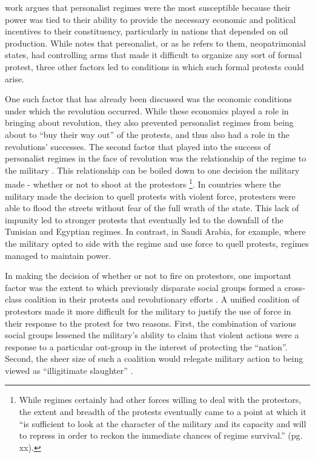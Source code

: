  work argues that personalist regimes were the most susceptible because their power was tied to their ability to provide the necessary economic and political incentives to their constituency, particularly in nations that depended on oil production.  While \cite{comunello_will_2012} notes that personalist, or as he refers to them, neopatrimonial states, had controlling arms that made it difficult to organize any sort of formal protest, three other factors led to conditions in which such formal protests could arise.

One such factor that has already been discussed was the economic conditions under which the revolution occurred. While these economics played a role in bringing about revolution, they also prevented personalist regimes from being about to ``buy their way out'' of the protests, and thus also had a role in the revolutions' successes. The second factor that played into the success of personalist regimes in the face of revolution was the relationship of the regime to the military \cite{comunello_will_2012,battera_perspectives_2014}.  This relationship can be boiled down to one decision the military made - whether or not to shoot at the protestors \cite{bellin_reconsidering_2012}\footnote{While regimes certainly had other forces willing to deal with the protestors, the extent and breadth of the protests eventually came to a point at which it ``is sufficient to look at the character of the military and its capacity and will to repress in order to reckon the immediate chances of regime survival.'' \cite{bellin_reconsidering_2012}(pg. xx).}.  In countries where the military made the decision to quell protests with violent force, protesters were able to flood the streets without fear of the full wrath of the state. This lack of impunity led to stronger protests that eventually led to the downfall of the Tunisian and Egyptian regimes.  In contrast, in Saudi Arabia, for example, where the military opted to side with the regime and use force to quell protests, regimes managed to maintain power.

In making the decision of whether or not to fire on protestors, one important factor was  the extent to which previously disparate social groups formed a cross-class coalition  in their protests and revolutionary efforts \cite{goldstone_cross-class_2011}.  A unified coalition of protestors made it more difficult for the military to justify the use of force in their response to the protest for two reasons. First, the combination of various social groups lessened the military's ability to claim that violent actions were a response to a particular out-group in the interest of protecting the ``nation''.  Second, the sheer size of such a coalition would relegate military action to being viewed as ``illigitimate slaughter'' \cite{bellin_reconsidering_2012}.  

